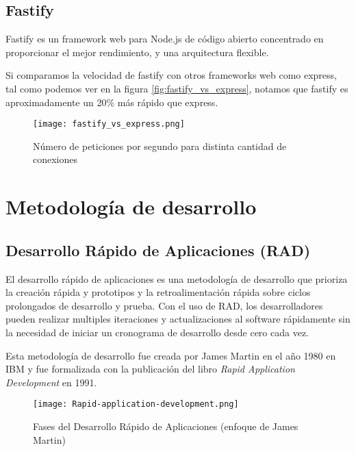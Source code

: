     \subsection{Fastify}

        Fastify es un framework web para Node.js de código abierto concentrado en proporcionar el mejor rendimiento, y una arquitectura flexible.

        Si comparamos la velocidad de fastify con otros frameworks web como express, tal como podemos ver en la figura \autoref{fig:fastify_vs_express}, notamos que fastify es aproximadamente un 20\% más rápido que express.

        \begin{figure}
            \texttt{[image: fastify\_vs\_express.png]}
            \caption{ Número de peticiones por segundo para distinta cantidad de conexiones}
            \label{fig:fastify_vs_express}
        \end{figure}
    


\section{Metodología de desarrollo}

    \subsection{Desarrollo Rápido de Aplicaciones (RAD)}

    El desarrollo rápido de aplicaciones es una metodología de desarrollo que prioriza la creación rápida y prototipos y la retroalimentación rápida sobre ciclos prolongados de desarrollo y prueba. Con el uso de RAD, los desarrolladores pueden realizar multiples iteraciones y actualizaciones al software rápidamente sin la necesidad de iniciar un cronograma de desarrollo desde cero cada vez.

    Esta metodología de desarrollo fue creada por James Martin en el año 1980 en IBM y fue formalizada con la publicación del libro \emph{Rapid Application Development} en 1991.

    \begin{figure}
        \texttt{[image: Rapid-application-development.png]}
        \caption{Fases del Desarrollo Rápido de Aplicaciones (enfoque de James Martin)}
        \label{fig:Rapid-application-development}
    \end{figure}

